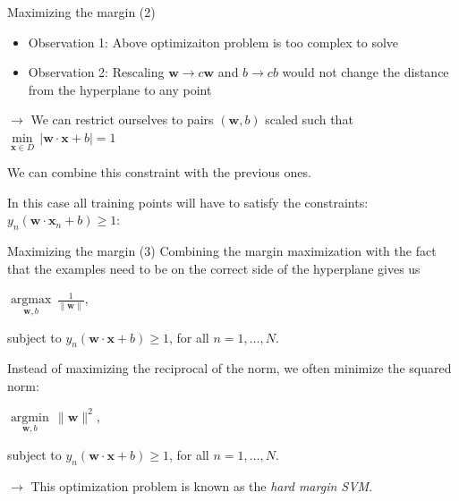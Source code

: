 \documentclass[dvipsnames]{beamer}
\DeclareMathOperator*{\argmax}{argmax}
\DeclareMathOperator*{\argmin}{argmin}
\begin{document}
    \begin{frame}{Maximizing the margin (2)}
			\begin{itemize}
				\item Observation 1: Above optimizaiton problem is too complex to solve %
				\item Observation 2: Rescaling $\mathbf{w} \rightarrow c\mathbf{w}$ and $b\rightarrow cb$ would not change the distance from the hyperplane to any point %
			\end{itemize}
			$\rightarrow$ We can restrict ourselves to pairs $(\mathbf{w},b)$ scaled such that $\underset{\mathbf{x}\in D}{\min}\, |\mathbf{w} \cdot \mathbf{x} + b| = 1$ %
			
			We can combine this constraint with the previous ones. %
			
			In this case all training points will have to satisfy the constraints: $y_{n}(\mathbf{w} \cdot \mathbf{x}_n + b) \geq 1$:
    \end{frame}
		
		\begin{frame}{Maximizing the margin (3)}
			Combining the margin maximization with the fact that the examples need to be on the correct side of the hyperplane gives us
			
			$\underset{\mathbf{w},b}{\argmax}\, \frac{1}{\|\mathbf{w}\|}$,
			
			subject to $y_{n}(\mathbf{w} \cdot \mathbf{x} + b)\geq 1$, for all $n = 1, \dots,N$. %
			
			Instead of maximizing the reciprocal of the norm, we often minimize the squared norm:
			
			$\underset{\mathbf{w},b}{\argmin}\,\|\mathbf{w}\|^2$,
			
			subject to $y_{n}(\mathbf{w} \cdot \mathbf{x} + b)\geq 1$, for all $n = 1, \dots,N$. %
			
			$\rightarrow$ This optimization problem is known as the \emph{hard margin SVM}.
    \end{frame}
		
\end{document}
